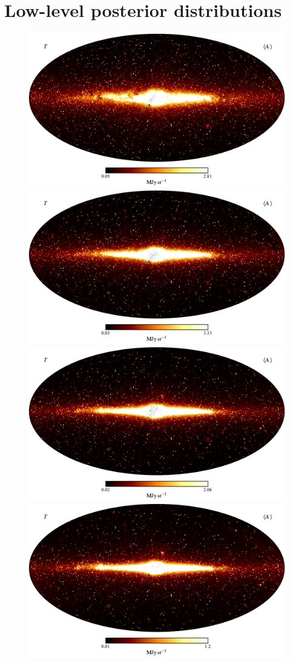 \documentclass{aa}
\begin{document}
\clearpage
\section{Low-level posterior distributions}
\label{sec:posteriors}

\begin{figure}
	\centering
	\includegraphics[width=0.58\linewidth]{figs/CG_DIRBE_01_n0512_DR2_I_MEAN_w18_n512_cb_c-afmhot.pdf}\\
        \includegraphics[width=0.58\linewidth]{figs/CG_DIRBE_02_n0512_DR2_I_MEAN_w18_n512_cb_c-afmhot.pdf}\\
        \includegraphics[width=0.58\linewidth]{figs/CG_DIRBE_03_n0512_DR2_I_MEAN_w18_n512_cb_c-afmhot.pdf}\\
        \includegraphics[width=0.58\linewidth]{figs/CG_DIRBE_04_n0512_DR2_I_MEAN_w18_n512_cb_c-afmhot.pdf}
	\caption{}
	\label{fig:freqmaps1_4}
\end{figure}
\end{document}
